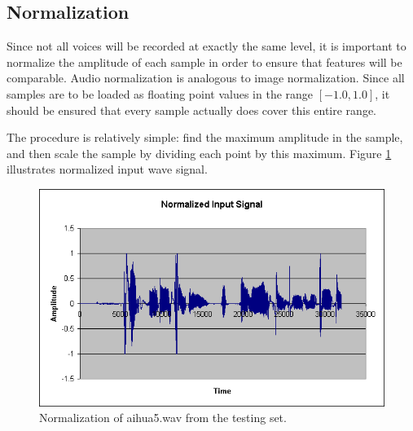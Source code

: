 \subsection{Normalization}

Since not all voices will be recorded at exactly the same level, it is important to normalize
the amplitude of each sample in order to ensure that features will be comparable.  Audio
normalization is analogous to image normalization.  Since all samples are to be loaded as
floating point values in the range $[-1.0, 1.0]$, it should be ensured that every sample actually
does cover this entire range.

The procedure is relatively simple: find the maximum amplitude in the sample, and then scale
the sample by dividing each point by this maximum. Figure \ref{fig:prep-norm} illustrates
normalized input wave signal.

\begin{figure}
	\centering
	\includegraphics[width=400pt]{../graphics/graphs/wav-normalized.png}
	\caption{Normalization of aihua5.wav from the testing set.}
	\label{fig:prep-norm}
\end{figure}
